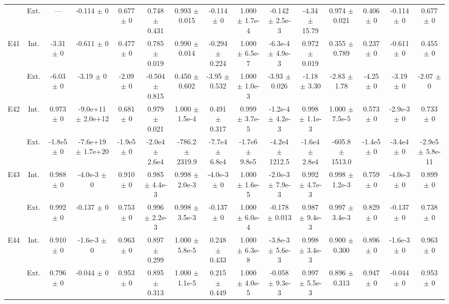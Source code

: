 \begin{table}[htbp]
{\begin{tabular}{@{}ccccccccccccccc@{}}
 & Ext. & --- & -0.114 $\pm$ 0 & 0.677 $\pm$ 0 & 0.748 $\pm$ 0.431 & 0.993 $\pm$ 0.015 & -0.114 $\pm$ 0 & 1.000 $\pm$ 1.7e-4 & -0.142 $\pm$ 2.5e-3 & -4.34 $\pm$ 15.79 & 0.974 $\pm$ 0.021 & 0.406 $\pm$ 0 & -0.114 $\pm$ 0 & 0.677 $\pm$ 0 \\
\cline{2-15}
\multirow{2}{*}{E41} & Int. & -3.31 $\pm$ 0 & -0.611 $\pm$ 0 & 0.477 $\pm$ 0 & 0.785 $\pm$ 0.019 & 0.990 $\pm$ 0.014 & -0.294 $\pm$ 0.224 & 1.000 $\pm$ 6.5e-7 & -6.3e-4 $\pm$ 4.9e-3 & 0.972 $\pm$ 0.019 & 0.355 $\pm$ 0.789 & 0.237 $\pm$ 0 & -0.611 $\pm$ 0 & 0.455 $\pm$ 0 \\
 & Ext. & -6.03 $\pm$ 0 & -3.19 $\pm$ 0 & -2.09 $\pm$ 0 & -0.504 $\pm$ 0.815 & 0.450 $\pm$ 0.602 & -3.95 $\pm$ 0.532 & 1.000 $\pm$ 1.0e-3 & -3.93 $\pm$ 0.026 & -1.18 $\pm$ 3.30 & -2.83 $\pm$ 1.78 & -4.25 $\pm$ 0 & -3.19 $\pm$ 0 & -2.07 $\pm$ 0 \\
\cline{2-15}
\multirow{2}{*}{E42} & Int. & 0.973 $\pm$ 0 & -9.0e+11 $\pm$ 2.0e+12 & 0.681 $\pm$ 0 & 0.979 $\pm$ 0.021 & 1.000 $\pm$ 1.5e-4 & 0.491 $\pm$ 0.317 & 0.999 $\pm$ 3.7e-5 & -1.2e-4 $\pm$ 4.2e-3 & 0.998 $\pm$ 1.1e-3 & 1.000 $\pm$ 7.5e-5 & 0.573 $\pm$ 0 & -2.9e-3 $\pm$ 0 & 0.733 $\pm$ 0 \\
 & Ext. & -1.8e5 $\pm$ 0 & -7.6e+19 $\pm$ 1.7e+20 & -1.9e5 $\pm$ 0 & -2.0e4 $\pm$ 2.6e4 & -786.2 $\pm$ 2319.9 & -7.7e4 $\pm$ 6.8e4 & -1.7e6 $\pm$ 9.8e5 & -4.2e4 $\pm$ 1212.5 & -1.6e4 $\pm$ 2.8e4 & -605.8 $\pm$ 1513.0 & -1.4e5 $\pm$ 0 & -3.4e4 $\pm$ 0 & -2.9e5 $\pm$ 5.8e-11 \\
\cline{2-15}
\multirow{2}{*}{E43} & Int. & 0.988 $\pm$ 0 & -4.0e-3 $\pm$ 0 & 0.910 $\pm$ 0 & 0.985 $\pm$ 4.4e-3 & 0.998 $\pm$ 2.0e-3 & -4.0e-3 $\pm$ 0 & 1.000 $\pm$ 1.6e-5 & -2.0e-3 $\pm$ 7.9e-3 & 0.992 $\pm$ 4.7e-3 & 0.998 $\pm$ 1.2e-3 & 0.759 $\pm$ 0 & -4.0e-3 $\pm$ 0 & 0.899 $\pm$ 0 \\
 & Ext. & 0.992 $\pm$ 0 & -0.137 $\pm$ 0 & 0.753 $\pm$ 0 & 0.996 $\pm$ 2.2e-3 & 0.998 $\pm$ 3.5e-3 & -0.137 $\pm$ 0 & 1.000 $\pm$ 6.0e-4 & -0.178 $\pm$ 0.013 & 0.987 $\pm$ 9.4e-3 & 0.997 $\pm$ 3.4e-3 & 0.829 $\pm$ 0 & -0.137 $\pm$ 0 & 0.738 $\pm$ 0 \\
\cline{2-15}
\multirow{2}{*}{E44} & Int. & 0.910 $\pm$ 0 & -1.6e-3 $\pm$ 0 & 0.963 $\pm$ 0 & 0.897 $\pm$ 0.299 & 1.000 $\pm$ 5.8e-5 & 0.248 $\pm$ 0.433 & 1.000 $\pm$ 6.3e-8 & -3.8e-3 $\pm$ 5.6e-3 & 0.998 $\pm$ 3.4e-3 & 0.900 $\pm$ 0.300 & 0.896 $\pm$ 0 & -1.6e-3 $\pm$ 0 & 0.963 $\pm$ 0 \\
 & Ext. & 0.796 $\pm$ 0 & -0.044 $\pm$ 0 & 0.953 $\pm$ 0 & 0.895 $\pm$ 0.313 & 1.000 $\pm$ 1.1e-5 & 0.215 $\pm$ 0.449 & 1.000 $\pm$ 4.0e-5 & -0.058 $\pm$ 9.3e-3 & 0.997 $\pm$ 5.5e-3 & 0.896 $\pm$ 0.313 & 0.947 $\pm$ 0 & -0.044 $\pm$ 0 & 0.953 $\pm$ 0 \\

\end{tabular}}
\end{table}

